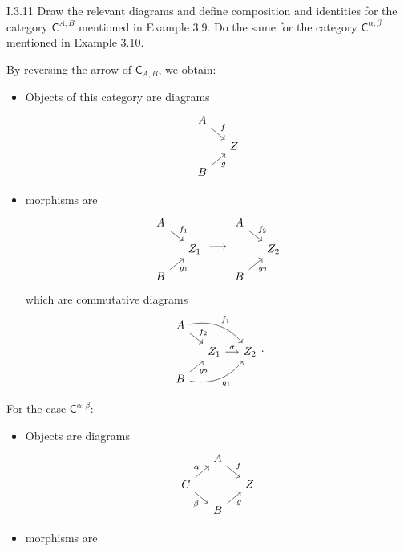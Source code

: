 \begin{problem}{I.3.11}
Draw the relevant diagrams and define composition and identities for the category $\mathsf{C}^{A,B}$ mentioned in Example 3.9. Do the same for the category $\mathsf{C}^{\alpha, \beta}$ mentioned in Example 3.10. 
\end{problem}
\begin{solution}
By reversing the arrow of $\mathsf{C}_{A,B}$, we obtain:
\begin{itemize}
\setlength\itemsep{0pt}
\item Objects of this category are diagrams
\[
\begin{tikzcd}[column sep=small, row sep=small]
A \arrow[dr, "f"] \\
& Z \\
B \arrow[ur, "g"']
\end{tikzcd}
\]
\item morphisms are 
\[
\begin{tikzcd}[column sep=small, row sep=small]
A \arrow[dr, "f_1"] \\
& Z_1 \\
B \arrow[ur, "g_1"']
\end{tikzcd}
\longrightarrow
\begin{tikzcd}[column sep=small, row sep=small]
A \arrow[dr, "f_2"] \\
& Z_2 \\
B \arrow[ur, "g_2"']
\end{tikzcd}    
\]
which are commutative diagrams
\[
\begin{tikzcd}[column sep=small, row sep=small]
A \arrow[dr, "f_2"] \arrow[drr, bend left, "f_1"] \\
&Z_1 \arrow[r, "\sigma"] &Z_2 \\
B \arrow[ur, "g_2"'] \arrow[urr, bend right, "g_1"']
\end{tikzcd}.
\]
\end{itemize}
For the case $\mathsf{C}^{\alpha, \beta}$:
\begin{itemize}
\item Objects are diagrams
\[
\begin{tikzcd}[column sep=small, row sep=small]
&A \arrow[dr, "f"] \\
C\arrow[ur, "\alpha"]\arrow[dr, "\beta"'] & &Z \\
&B \arrow[ur, "g"']
\end{tikzcd}  
\]
\item morphisms are 
\[
\begin{tikzcd}[column sep=small, row sep=small]

\end{tikzcd}\]
\end{itemize}
\end{solution}
